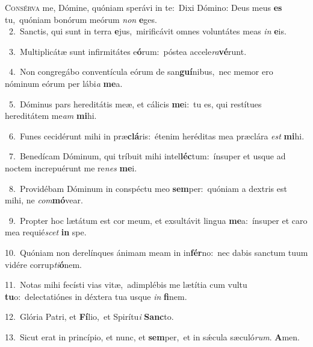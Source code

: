 \lettrine{\initial\textcolor{\initialcolor}{C}}{onsérva} me, Dómine, quóniam sperávi in te:~\dagger Dixi Dómino: Deus meus \textbf{es} tu,~\star quóniam bonórum meórum \textit{non} \textbf{e}\-ges.\\
{\numbfont\textcolor{\numbcolor}{~2.}}~Sanctis, qui sunt in terra \textbf{e}\-jus,~\star mirificávit omnes voluntátes meas \textit{in} \textbf{e}\-is.\par
{\numbfont\textcolor{\numbcolor}{~3.}}~Multiplicátæ sunt infirmitátes e\-\textbf{ó}\-rum:~\star póstea accele\-\textit{ra}\-\textbf{vé}runt.\par
{\numbfont\textcolor{\numbcolor}{~4.}}~Non congregábo conventícula eórum de san\-\textbf{guí}\-nibus,~\star nec memor ero nóminum eórum per lábi\textit{a} \textbf{me}\-a.\par
{\numbfont\textcolor{\numbcolor}{~5.}}~Dóminus pars hereditátis meæ, et cálicis \textbf{me}\-i:~\star tu es, qui restítues hereditátem me\textit{am} \textbf{mi}\-hi.\par
{\numbfont\textcolor{\numbcolor}{~6.}}~Funes cecidérunt mihi in præ\-\textbf{clá}\-ris:~\star étenim heréditas mea præclára \textit{est} \textbf{mi}\-hi.\par
{\numbfont\textcolor{\numbcolor}{~7.}}~Benedícam Dóminum, qui tríbuit mihi intel\-\textbf{léc}\-tum:~\star ínsuper et usque ad noctem increpuérunt me re\textit{nes} \textbf{me}\-i.\par
{\numbfont\textcolor{\numbcolor}{~8.}}~Providébam Dóminum in conspéctu meo \textbf{sem}\-per:~\star quóniam a dextris est mihi, ne \textit{com}\-\textbf{mó}vear.\par
{\numbfont\textcolor{\numbcolor}{~9.}}~Propter hoc lætátum est cor meum, et exsultávit lingua \textbf{me}\-a:~\star ínsuper et caro mea requié\textit{scet} \textbf{in} spe.\par
{\numbfont\textcolor{\numbcolor}{10.}}~Quóniam non derelínques ánimam meam in in\-\textbf{fér}\-no:~\star nec dabis sanctum tuum vidére corrup\-\textit{ti}\-\textbf{ó}nem.\par
{\numbfont\textcolor{\numbcolor}{11.}}~Notas mihi fecísti vias vitæ,~\dagger adimplébis me lætítia cum vultu \textbf{tu}\-o:~\star delectatiónes in déxtera tua usque \textit{in} \textbf{fi}\-nem.\par
{\numbfont\textcolor{\numbcolor}{12.}}~Glória Patri, et \textbf{Fí}\-lio,~\star et Spirítu\textit{i} \textbf{Sanc}\-to.\par
{\numbfont\textcolor{\numbcolor}{13.}}~Sicut erat in princípio, et nunc, et \textbf{sem}\-per,~\star et in sǽcula sæculó\-\textit{rum}\-. \textbf{A}\-men.\par
